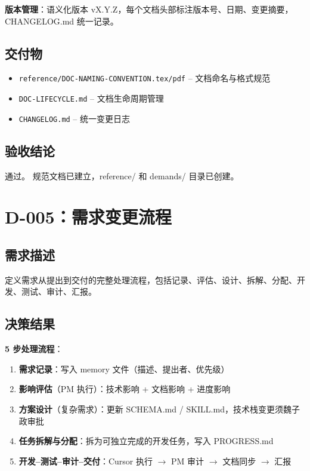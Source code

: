 \documentclass[11pt,a4paper]{article}
\begin{document}
\textbf{版本管理}：语义化版本 vX.Y.Z，每个文档头部标注版本号、日期、变更摘要，CHANGELOG.md 统一记录。

\subsection{交付物}

\begin{itemize}[nosep]
  \item \texttt{reference/DOC-NAMING-CONVENTION.tex/pdf} -- 文档命名与格式规范
  \item \texttt{DOC-LIFECYCLE.md} -- 文档生命周期管理
  \item \texttt{CHANGELOG.md} -- 统一变更日志
\end{itemize}

\subsection{验收结论}

\textcolor{success}{通过。} 规范文档已建立，reference/ 和 demands/ 目录已创建。

\section{D-005：需求变更流程}

\subsection{需求描述}

定义需求从提出到交付的完整处理流程，包括记录、评估、设计、拆解、分配、开发、测试、审计、汇报。

\subsection{决策结果}

\textbf{5 步处理流程}：

\begin{enumerate}
  \item \textbf{需求记录}：写入 memory 文件（描述、提出者、优先级）
  \item \textbf{影响评估}（PM 执行）：技术影响 + 文档影响 + 进度影响
  \item \textbf{方案设计}（复杂需求）：更新 SCHEMA.md / SKILL.md，技术栈变更须魏子政审批
  \item \textbf{任务拆解与分配}：拆为可独立完成的开发任务，写入 PROGRESS.md
  \item \textbf{开发--测试--审计--交付}：Cursor 执行 $\to$ PM 审计 $\to$ 文档同步 $\to$ 汇报
\end{enumerate}
\end{document}

